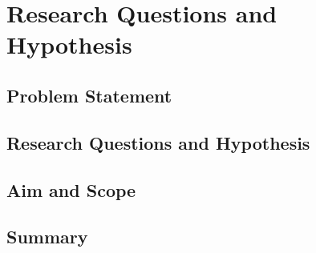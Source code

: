 \chapter{Research Questions and Hypothesis}\label{chap:hypothesis}



\section{Problem Statement}\label{sec:problem-statement}



\section{Research Questions and Hypothesis}\label{sec:hypothesis}



\section{Aim and Scope}\label{sec:aim}



\section{Summary}\label{sec:summary:hypothesis}


